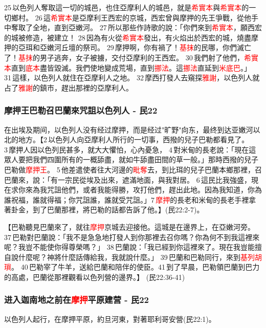 25 以色列人奪取這一切的城邑，也住亞摩利人的城邑，就是\textcolor{red}{希實本}與\textcolor{red}{希實本}的一切鄉村。 26 這\textcolor{red}{希實本}是亞摩利王西宏的京城，西宏曾與摩押的先王爭戰，從他手中奪取了全地，直到亞嫩河。 27 所以那些作詩歌的說：「你們來到\textcolor{red}{希實本}，願西宏的城被修造，被建立！ 28 因為有火從\textcolor{red}{希實本}發出，有火焰出於西宏的城，燒盡摩押的亞珥和亞嫩河丘壇的祭司。 29 摩押啊，你有禍了！\textcolor{red}{基抹}的民哪，你們滅亡了！\textcolor{red}{基抹}的男子逃奔，女子被擄，交付亞摩利的王西宏。 30 我們射了他們，\textcolor{red}{希實本}直到\textcolor{red}{底本}盡皆毀滅。我們使地變成荒場，直到\textcolor{red}{挪法}。這\textcolor{red}{挪法}直延到\textcolor{red}{米底巴}。」 31 這樣，以色列人就住在亞摩利人之地。 32 摩西打發人去窺探\textcolor{red}{雅謝}，以色列人就占了\textcolor{red}{雅謝}的鎮市，趕出那裡的亞摩利人。




\subsubsection{摩押王巴勒召巴蘭來咒詛以色列人 - 民22}
在出埃及期间，以色列人没有经过摩押，而是经过"旷野"向东，最终到达亚嫩河以北的地方。【2 以色列人向亞摩利人所行的一切事，西撥的兒子巴勒都看見了。 3 摩押人因以色列民甚多，就大大懼怕，心內憂急， 4 對米甸的長老說：「現在這眾人要把我們四圍所有的一概舔盡，就如牛舔盡田間的草一般。」那時西撥的兒子巴勒做\textcolor{red}{摩押王}。 5 他差遣使者往大河邊的\textcolor{red}{毗奪}去，到比珥的兒子巴蘭本鄉那裡，召巴蘭來，說：「有一宗民從埃及出來，遮滿地面，與我對居。 6 這民比我強盛，現在求你來為我咒詛他們，或者我能得勝，攻打他們，趕出此地。因為我知道，你為誰祝福，誰就得福；你咒詛誰，誰就受咒詛。」7 \textcolor{red}{摩押}的長老和米甸的長老手裡拿著卦金，到了巴蘭那裡，將巴勒的話都告訴了他。】(民22:2-7)。

【巴勒聽見巴蘭來了，就往\textcolor{red}{摩押}京城去迎接他。這城是在邊界上，在亞嫩河旁。 37 巴勒對巴蘭說：「我不是急急地打發人到你那裡去召你嗎？你為何不到我這裡來呢？我豈不能使你得尊榮嗎？」 38 巴蘭說：「我已經到你這裡來了。現在我豈能擅自說什麼呢？神將什麼話傳給我，我就說什麼。」 39 巴蘭和巴勒同行，來到\textcolor{red}{基列胡瑣}。 40 巴勒宰了牛羊，送給巴蘭和陪伴的使臣。41 到了早晨，巴勒領巴蘭到巴力的高處，巴蘭從那裡觀看以色列營的邊界。】 (民22:36-41)

\subsubsection{进入迦南地之前在\textcolor{red}{摩押}平原建营 - 民22}
以色列人起行，在摩押平原，約旦河東，對著耶利哥安營(民22:1)。

